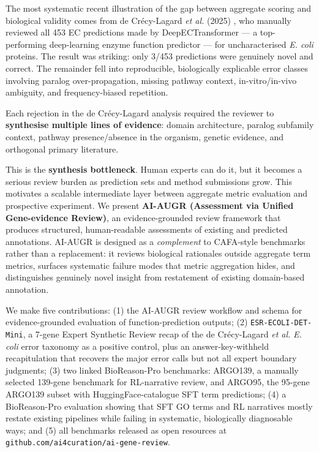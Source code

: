 \documentclass[
  11pt,
]{article}
\begin{document}
The most systematic recent illustration of the gap between aggregate
scoring and biological validity comes from de Crécy-Lagard \emph{et al.}
(2025) \cite{decrecylagard2025}, who manually reviewed all 453 EC predictions made by
DeepECTransformer --- a top-performing deep-learning enzyme function
predictor --- for uncharacterised \emph{E. coli} proteins. The result
was striking: only 3/453 predictions were genuinely novel and correct.
The remainder fell into reproducible, biologically explicable error
classes involving paralog over-propagation, missing pathway context,
in-vitro/in-vivo ambiguity, and frequency-biased repetition.

Each rejection in the de Crécy-Lagard analysis required the reviewer to
\textbf{synthesise multiple lines of evidence}: domain architecture, paralog
subfamily context, pathway presence/absence in the organism, genetic
evidence, and orthogonal primary literature.

This is the
\textbf{synthesis bottleneck}. Human experts can do it, but it becomes a
serious review burden as prediction sets and method submissions grow.
This motivates a scalable intermediate layer between aggregate metric
evaluation and prospective experiment. We present \textbf{AI-AUGR
(Assessment via Unified Gene-evidence Review)}, an evidence-grounded
review framework that produces structured, human-readable assessments
of existing and predicted annotations. AI-AUGR is designed as
a \emph{complement} to CAFA-style benchmarks rather than a
replacement: it reviews biological rationales outside aggregate term
metrics, surfaces systematic failure modes that metric aggregation
hides, and distinguishes genuinely novel insight from restatement of
existing domain-based annotation.

We make five contributions: (1) the AI-AUGR review workflow and schema for
evidence-grounded evaluation of function-prediction outputs; (2)
\texttt{ESR-ECOLI-DET-Mini}, a 7-gene Expert Synthetic Review recap of
the de Crécy-Lagard \emph{et al.} \cite{decrecylagard2025} \emph{E. coli} error taxonomy
as a positive control, plus an answer-key-withheld recapitulation that
recovers the major error calls but not all expert boundary judgments;
(3) two linked BioReason-Pro benchmarks: ARGO139, a manually selected
139-gene benchmark for RL-narrative review, and ARGO95, the 95-gene
ARGO139 subset with HuggingFace-catalogue SFT term predictions; (4) a BioReason-Pro
evaluation showing that SFT GO terms and RL narratives mostly restate
existing pipelines while failing in systematic, biologically diagnosable
ways; and (5) all benchmarks released as open resources at
\texttt{github.com/ai4curation/ai-gene-review}.
\end{document}
